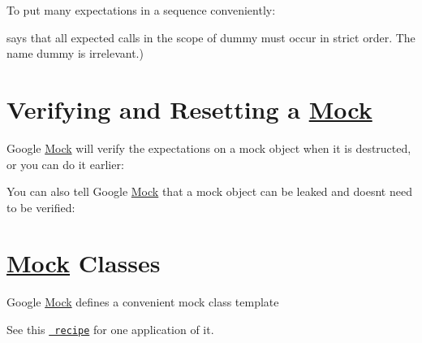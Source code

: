 To put many expectations in a sequence conveniently\+: 
\begin{DoxyCode}{0}
\DoxyCodeLine{\{}
\DoxyCodeLine{}
\DoxyCodeLine{\}}
\end{DoxyCode}
 says that all expected calls in the scope of {\ttfamily dummy} must occur in strict order. The name {\ttfamily dummy} is irrelevant.)

\section*{Verifying and Resetting a \mbox{\hyperlink{class_mock}{Mock}}}

Google \mbox{\hyperlink{class_mock}{Mock}} will verify the expectations on a mock object when it is destructed, or you can do it earlier\+: 
\begin{DoxyCode}{0}
\end{DoxyCode}


You can also tell Google \mbox{\hyperlink{class_mock}{Mock}} that a mock object can be leaked and doesn\textquotesingle{}t need to be verified\+: 
\begin{DoxyCode}{0}
\end{DoxyCode}


\section*{\mbox{\hyperlink{class_mock}{Mock}} Classes}

Google \mbox{\hyperlink{class_mock}{Mock}} defines a convenient mock class template 
\begin{DoxyCode}{0}
\DoxyCodeLine{\};}
\end{DoxyCode}
 See this \href{CookBook.md\#using-check-points}{\texttt{ recipe}} for one application of it.

